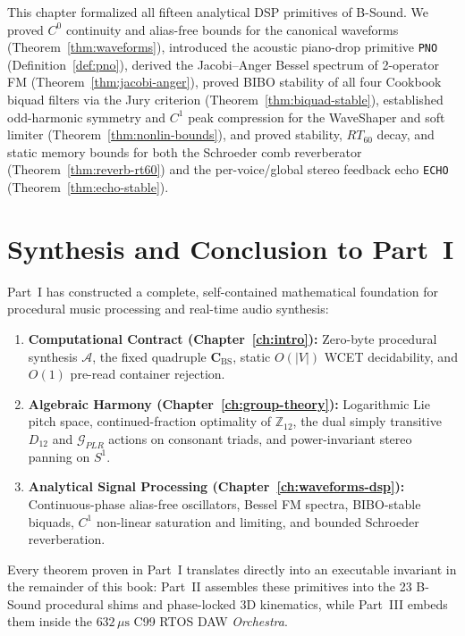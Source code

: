This chapter formalized all fifteen analytical DSP primitives of B-Sound. We proved $C^0$ continuity and alias-free bounds for the canonical waveforms (Theorem~\ref{thm:waveforms}), introduced the acoustic piano-drop primitive \texttt{PNO} (Definition~\ref{def:pno}), derived the Jacobi--Anger Bessel spectrum of 2-operator FM (Theorem~\ref{thm:jacobi-anger}), proved BIBO stability of all four Cookbook biquad filters via the Jury criterion (Theorem~\ref{thm:biquad-stable}), established odd-harmonic symmetry and $C^1$ peak compression for the WaveShaper and soft limiter (Theorem~\ref{thm:nonlin-bounds}), and proved stability, $RT_{60}$ decay, and static memory bounds for both the Schroeder comb reverberator (Theorem~\ref{thm:reverb-rt60}) and the per-voice/global stereo feedback echo \texttt{ECHO} (Theorem~\ref{thm:echo-stable}).

\section*{Synthesis and Conclusion to Part~I}

Part~I has constructed a complete, self-contained mathematical foundation for procedural music processing and real-time audio synthesis:
\begin{enumerate}[leftmargin=1.5em]
  \item \textbf{Computational Contract (Chapter~\ref{ch:intro}):} Zero-byte procedural synthesis $\mathcal{A}$, the fixed quadruple $\mathbf{C}_{\mathrm{BS}}$, static $O(|V|)$ WCET decidability, and $O(1)$ pre-read container rejection.
  \item \textbf{Algebraic Harmony (Chapter~\ref{ch:group-theory}):} Logarithmic Lie pitch space, continued-fraction optimality of $\mathbb{Z}_{12}$, the dual simply transitive $D_{12}$ and $\mathcal{G}_{PLR}$ actions on consonant triads, and power-invariant stereo panning on $S^1$.
  \item \textbf{Analytical Signal Processing (Chapter~\ref{ch:waveforms-dsp}):} Continuous-phase alias-free oscillators, Bessel FM spectra, BIBO-stable biquads, $C^1$ non-linear saturation and limiting, and bounded Schroeder reverberation.
\end{enumerate}
Every theorem proven in Part~I translates directly into an executable invariant in the remainder of this book: Part~II assembles these primitives into the 23 B-Sound procedural shims and phase-locked 3D kinematics, while Part~III embeds them inside the $632\,\mu\text{s}$ C99 RTOS DAW \emph{Orchestra}.
